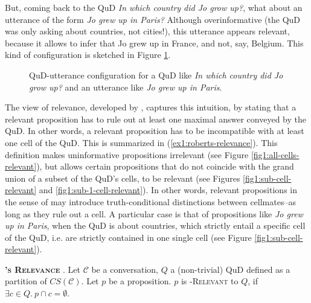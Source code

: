 But, coming back to the QuD \textit{In which country did Jo grow up?}, what about an utterance of the form \textit{Jo grew up in Paris?} Although overinformative (the QuD was only asking about countries, not cities!), this utterance appears relevant, because it allows to infer that Jo grew up in France, and not, say, Belgium. This kind of configuration is sketched in Figure \ref{fig1:relevance-example-2}.

\begin{figure}[H]
	\centering
	\caption{QuD-utterance configuration for a QuD like \textit{In which country did Jo grow up?} and an utterance like \textit{Jo grew up in Paris}.}\label{fig1:relevance-example-2}
\end{figure}

The view of relevance, developed by \textcite{Roberts2012}, captures this intuition, by stating that a relevant proposition has to rule out at least one maximal answer conveyed by the QuD. In other words, a relevant proposition has to be incompatible with at least one cell of the QuD. This is summarized in (\ref{ex1:roberts-relevance}). This definition makes uninformative propositions irrelevant (see Figure \ref{fig1:all-cells-relevant}), but allows certain propositions that do not coincide with the grand union of a subset of the QuD's cells, to be relevant (see Figures \ref{fig1:sub-cell-relevant} and \ref{fig1:sub-1-cell-relevant}). In other words, relevant propositions in the sense of \citeauthor{Roberts2012} may introduce truth-conditional distinctions between cellmates--as long as they rule out a cell. A particular case is that of propositions like \textit{Jo grew up in Paris}, when the QuD is about countries, which strictly entail a specific cell of the QuD, i.e. are strictly contained in one single cell (see Figure \ref{fig1:sub-cell-relevant}).


\begin{exe}
	\ex\label{ex1:roberts-relevance} {\textsc{\textbf{\citeauthor{Roberts2012}'s Relevance}} \parencite{Roberts2012}. Let $\mathcal{C}$ be a conversation, $Q$ a (non-trivial) QuD defined as a partition of $CS(\mathcal{C})$. Let $p$ be a proposition. $p$ is \textsc{\citeauthor{Roberts2012}-Relevant} to $Q$, if $\exists c \in Q. \ p \cap c = \emptyset$.
	}
\end{exe}


